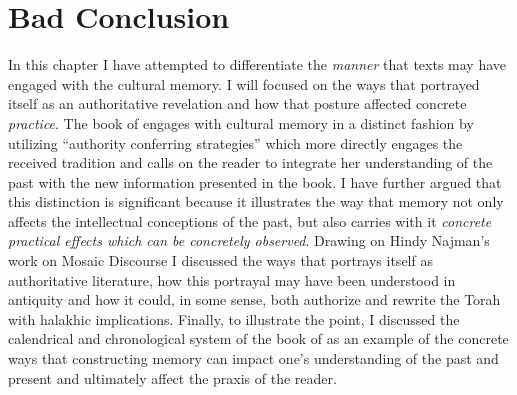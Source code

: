 
\section{Bad Conclusion}
In this chapter I have attempted to differentiate the \emph{manner} that \rwb texts may have engaged with the cultural memory. I will focused on the ways that \jub portrayed itself as an authoritative revelation and how that posture affected concrete \emph{practice}. The book of \jub engages with cultural memory in a distinct fashion \visavis \ga by utilizing ``authority conferring strategies'' which more directly engages the received tradition and calls on the reader to integrate her understanding of the past with the new information presented in the book. I have further argued that this distinction is significant because it illustrates the way that memory not only affects the intellectual conceptions of the past, but also carries with it \emph{concrete practical effects which can be concretely observed}. Drawing on Hindy Najman's work on Mosaic Discourse I discussed the ways that \jub portrays itself as authoritative literature, how this portrayal may have been understood in antiquity and how it could, in some sense, both authorize and rewrite the Torah with halakhic implications. Finally, to illustrate the point, I discussed the calendrical and chronological system of the book of \jub as an example of the concrete ways that constructing memory can impact one's understanding of the past and present and ultimately affect the praxis of the reader.